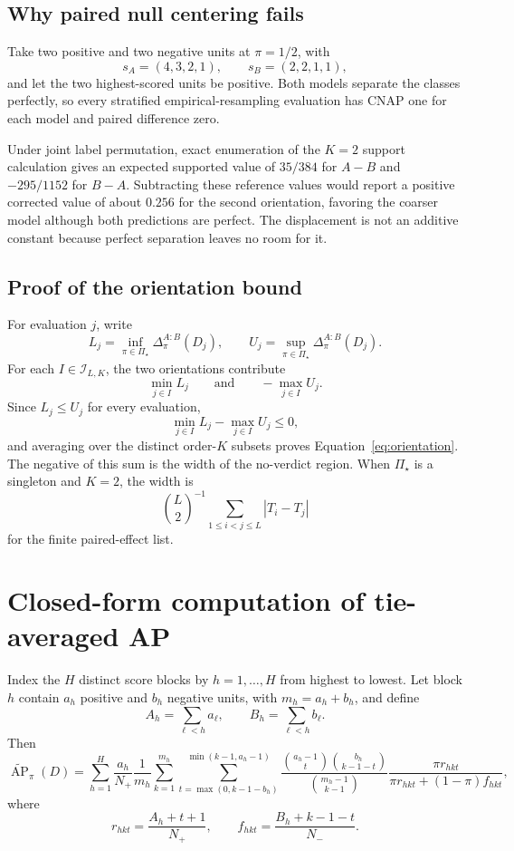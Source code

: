 \documentclass[11pt]{article}
\newcommand{\AP}{\operatorname{AP}}
\newcommand{\PSet}{\Pi_\star}
\newcommand{\APta}{\widetilde{\AP}}
\theoremstyle{remark}
\begin{document}
\subsection{Why paired null centering fails}

Take two positive and two negative units at $\pi=1/2$, with
\[
s_A=(4,3,2,1),
\qquad
s_B=(2,2,1,1),
\]
and let the two highest-scored units be positive. Both models separate the classes perfectly, so every stratified empirical-resampling evaluation has CNAP one for each model and paired difference zero.

Under joint label permutation, exact enumeration of the $K=2$ support calculation gives an expected supported value of $35/384$ for $A-B$ and $-295/1152$ for $B-A$. Subtracting these reference values would report a positive corrected value of about $0.256$ for the second orientation, favoring the coarser model although both predictions are perfect. The displacement is not an additive constant because perfect separation leaves no room for it.

\subsection{Proof of the orientation bound}

For evaluation $j$, write
\[
L_j=\inf_{\pi\in\PSet}\Delta^{A:B}_\pi(D_j),
\qquad
U_j=\sup_{\pi\in\PSet}\Delta^{A:B}_\pi(D_j).
\]
For each $I\in\mathcal I_{L,K}$, the two orientations contribute
\[
\min_{j\in I}L_j
\qquad\text{and}\qquad
-\max_{j\in I}U_j.
\]
Since $L_j\leq U_j$ for every evaluation,
\[
\min_{j\in I}L_j-\max_{j\in I}U_j
\leq0,
\]
and averaging over the distinct order-$K$ subsets proves
Equation~\eqref{eq:orientation}. The negative of this sum is the width of the
no-verdict region. When $\PSet$ is a singleton and $K=2$, the width is
\[
\binom{L}{2}^{-1}\sum_{1\leq i<j\leq L}|T_i-T_j|
\]
for the finite paired-effect list.

\section{Closed-form computation of tie-averaged AP}
\label{app:tie-computation}

Index the $H$ distinct score blocks by $h=1,\ldots,H$ from highest to lowest. Let block $h$ contain $a_h$ positive and $b_h$ negative units, with $m_h=a_h+b_h$, and define
\[
A_h=\sum_{\ell<h}a_\ell,
\qquad
B_h=\sum_{\ell<h}b_\ell.
\]
Then
\begin{equation}
\APta_\pi(D)
=
\sum_{h=1}^{H}
\frac{a_h}{N_+}\frac1{m_h}
\sum_{k=1}^{m_h}
\sum_{t=\max(0,k-1-b_h)}^{\min(k-1,a_h-1)}
\frac{\binom{a_h-1}{t}\binom{b_h}{k-1-t}}
{\binom{m_h-1}{k-1}}
\frac{\pi r_{hkt}}
{\pi r_{hkt}+(1-\pi)f_{hkt}},
\label{eq:tie-closed}
\end{equation}
where
\[
r_{hkt}=\frac{A_h+t+1}{N_+},
\qquad
f_{hkt}=\frac{B_h+k-1-t}{N_-}.
\]
\end{document}
